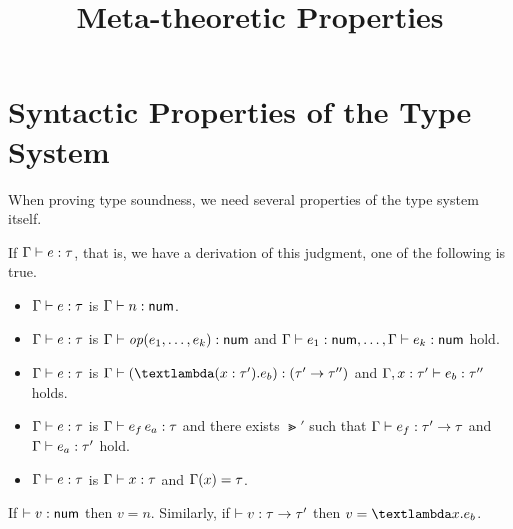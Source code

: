 \documentclass{article}
\title{Meta-theoretic Properties}
\author{}
\date{}
\begin{document}
\maketitle

\section{Syntactic Properties of the Type System}

When proving type soundness, we need several properties of the type system itself.

\begin{prop}[Inversion]
  If $\Gamma \vdash e : \tau$, that is, we have a derivation of this judgment, one of the following is true.
  \begin{itemize}
    \item $\Gamma \vdash e : \tau$ is $\Gamma \vdash n : \mathsf{num}$.
    \item $\Gamma \vdash e : \tau$ is $\Gamma \vdash \mathit{op}\!\left(e_1,\dots,e_k\right) : \mathsf{num}$ and $\Gamma \vdash e_1 : \mathsf{num},\dots,\Gamma \vdash e_k : \mathsf{num}$ hold.
    \item $\Gamma \vdash e : \tau$ is $\TTypes{\GG}{(\TFun{(\TAnn{x}{\Gt'})}{e_b})}{(\TArrow{\Gt'}{\Gt''})}$ and $\Gamma,x : \tau' \vdash e_b : \tau''$ holds.
    \item $\Gamma \vdash e : \tau$ is $\Gamma \vdash e_f \, e_a : \tau$ and there exists $\Gt'$ such that $\Gamma \vdash e_f : \tau' \to \tau$ and $\Gamma \vdash e_a : \tau'$ hold.
    \item $\Gamma \vdash e : \tau$ is $\Gamma \vdash x : \tau$ and $\Gamma(x)=\tau$.
  \end{itemize}
\end{prop}

\begin{prop}
  If $\vdash v : \mathsf{num}$ then $v=n$. Similarly, if $\vdash v : \tau \to \tau'$ then $v=\TFun{x}{e_b}$.
\end{prop}
\end{document}
